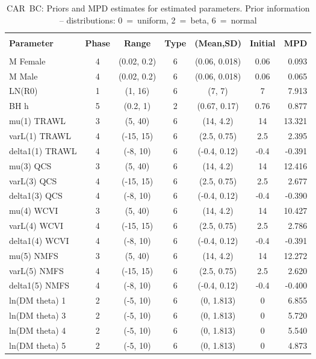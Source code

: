 
\setlength{\tabcolsep}{2pt}
\begin{table}[!h]
\centering
\caption{CAR~BC: Priors and MPD estimates for estimated parameters. Prior information -- distributions: 0~=~uniform, 2~=~beta, 6~=~normal}
\label{tab:car.parest}
\usefont{\encodingdefault}{\familydefault}{\seriesdefault}{\shapedefault}\small
\begin{tabular}{lcccccr}
\hline \\ [-1.5ex]
{\bf Parameter} & {\bf Phase} & {\bf Range} & {\bf Type} & {\bf (Mean,SD)} & {\bf Initial} & {\bf MPD} \\ [1ex]
\hline \\ [-1.5ex]
M Female & 4 & (0.02, 0.2) & 6 & (0.06, 0.018) & 0.06 & 0.093 \\
M Male & 4 & (0.02, 0.2) & 6 & (0.06, 0.018) & 0.06 & 0.065 \\
LN(R0) & 1 & (1, 16) & 6 & (7, 7) & 7 & 7.913 \\
BH h & 5 & (0.2, 1) & 2 & (0.67, 0.17) & 0.76 & 0.877 \\
mu(1) TRAWL & 3 & (5, 40) & 6 & (14, 4.2) & 14 & 13.321 \\
varL(1) TRAWL & 4 & (-15, 15) & 6 & (2.5, 0.75) & 2.5 & 2.395 \\
delta1(1) TRAWL & 4 & (-8, 10) & 6 & (-0.4, 0.12) & -0.4 & -0.391 \\
mu(3) QCS & 3 & (5, 40) & 6 & (14, 4.2) & 14 & 12.416 \\
varL(3) QCS & 4 & (-15, 15) & 6 & (2.5, 0.75) & 2.5 & 2.677 \\
delta1(3) QCS & 4 & (-8, 10) & 6 & (-0.4, 0.12) & -0.4 & -0.390 \\
mu(4) WCVI & 3 & (5, 40) & 6 & (14, 4.2) & 14 & 10.427 \\
varL(4) WCVI & 4 & (-15, 15) & 6 & (2.5, 0.75) & 2.5 & 2.786 \\
delta1(4) WCVI & 4 & (-8, 10) & 6 & (-0.4, 0.12) & -0.4 & -0.391 \\
mu(5) NMFS & 3 & (5, 40) & 6 & (14, 4.2) & 14 & 12.272 \\
varL(5) NMFS & 4 & (-15, 15) & 6 & (2.5, 0.75) & 2.5 & 2.620 \\
delta1(5) NMFS & 4 & (-8, 10) & 6 & (-0.4, 0.12) & -0.4 & -0.400 \\
ln(DM theta) 1 & 2 & (-5, 10) & 6 & (0, 1.813) & 0 & 6.855 \\
ln(DM theta) 3 & 2 & (-5, 10) & 6 & (0, 1.813) & 0 & 5.720 \\
ln(DM theta) 4 & 2 & (-5, 10) & 6 & (0, 1.813) & 0 & 5.540 \\
ln(DM theta) 5 & 2 & (-5, 10) & 6 & (0, 1.813) & 0 & 4.873 \\
\hline
\end{tabular}
\usefont{\encodingdefault}{\familydefault}{\seriesdefault}{\shapedefault}\normalsize
\end{table}

